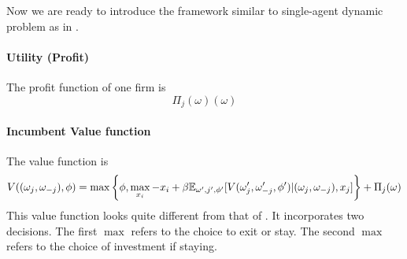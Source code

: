 \documentclass[12pt]{article}[margin=1in]
\begin{document}
Now we are ready to introduce the framework similar to single-agent dynamic problem as in \citet{rust1987optimal}.
\paragraph{Utility (Profit)}
The profit function of one firm is
\begin{equation*}
    \Pi_j(\omega)(\omega)
\end{equation*}




\paragraph{Incumbent Value function} The value function is
\begin{equation*}
    \begin{split}
        V((\omega_j, \omega_{-j}),\phi) & = \max\left\{\phi,\max_{x_i}-x_i+\beta\mathbb{E}_{\omega',j',\phi'}[V(\omega_j',\omega_{-j}',\phi')|(\omega_j, \omega_{-j}),x_j]\right\} + \Pi_j(\omega)\\
    \end{split}
\end{equation*}
 This value function looks quite different from that of \citet{rust1987optimal}. It incorporates two decisions. The first $\max$ refers to the choice to exit or stay. The second $\max$ refers to the choice of investment if staying.
\end{document}

